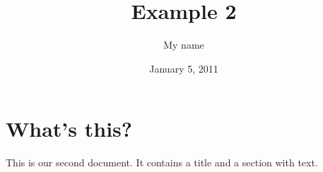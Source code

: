 \documentclass[a4paper,11pt]{article}
\begin{document}
\title{Example 2}
\author{My name}
\date{January 5, 2011}
\maketitle
\section{What's this?}
This is our second document. It contains a title and a section with text.
\end{document}
